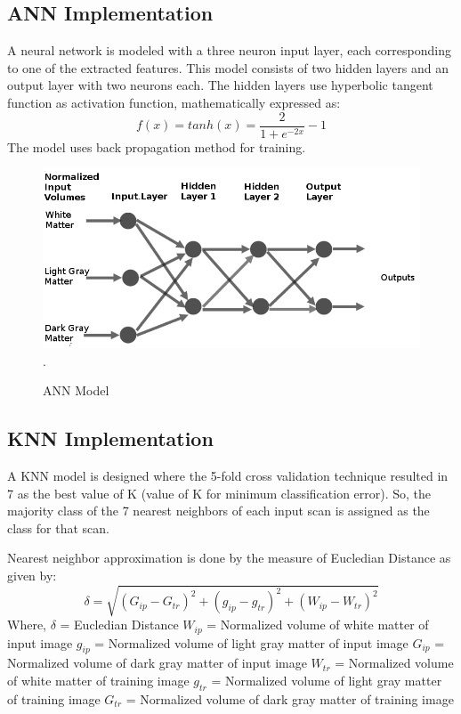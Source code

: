 \documentclass[journal,twoside]{IEEEtran}
\begin{document}
\subsection{ANN Implementation}
A neural network is modeled with a three neuron input layer, each corresponding to one of the extracted features. This model consists of two hidden layers and an output layer with two neurons each. The hidden layers use hyperbolic tangent function as activation function, mathematically expressed as:
\begin{equation}
f(x) = tanh(x) = \frac{2}{1+e^{-2x}} - 1 
\end{equation}
The model uses back propagation method for training.
\begin{figure}[h]
\centering
\includegraphics[scale=.3]{ANN.png}
\DeclareGraphicsExtensions.
\caption{ANN Model}
\end{figure}
\subsection{KNN Implementation}
A KNN model is designed where the 5-fold cross validation technique resulted in 7 as the best value of K (value of K for minimum classification error). So, the majority class of the 7 nearest neighbors of each input scan is assigned as the class for that scan. 
\par Nearest neighbor approximation is done by the measure of Eucledian Distance as given by:
\begin{equation}
\delta = \sqrt{ (G_{ip}-G_{tr})^2 +(g_{ip}-g_{tr})^2 +(W_{ip}-W_{tr})^2}
\end{equation}
Where,
\newline $\delta$ = Eucledian Distance
\newline $W_{ip}$ = Normalized volume of white matter of input image
\newline $g_{ip}$ = Normalized volume of light gray matter of input image
\newline $G_{ip}$ = Normalized volume of dark gray matter of input image
\newline $W_{tr}$ = Normalized volume of white matter of training image
\newline $g_{tr}$ = Normalized volume of light gray matter of training image
\newline $G_{tr}$ = Normalized volume of dark gray matter of training image
\end{document}
